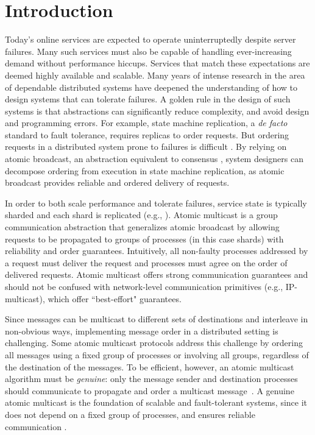 \section{Introduction}
\label{sec:introduction}

Today's online services are expected to operate uninterruptedly despite server failures.
Many such services must also be capable of handling ever-increasing demand without performance hiccups.
Services that match these expectations are deemed highly available and scalable.
Many years of intense research in the area of dependable distributed systems have deepened the understanding of how to design systems that can tolerate failures.
A golden rule in the design of such systems is that abstractions can significantly reduce complexity, and avoid design and programming errors.
For example, state machine replication, a \emph{de facto} standard to fault tolerance, requires replicas to order requests.
But ordering requests in a distributed system prone to failures is difficult \cite{FLP85}.
By relying on atomic broadcast, an abstraction equivalent to consensus \cite{HT93,CT96}, system designers can decompose ordering from execution in state machine replication, as atomic broadcast provides reliable and ordered delivery of requests.

In order to both scale performance and tolerate failures, service state is typically sharded and each shard is replicated (e.g., \cite{CDE12,Long2019,Aguilera:2007}).
Atomic multicast is a group communication abstraction that generalizes atomic broadcast by allowing requests to be propagated to groups of processes (in this case shards) with reliability and order guarantees.
Intuitively, all non-faulty processes addressed by a request must deliver the request and processes must agree on the order of delivered requests.
Atomic multicast offers strong communication guarantees and should not be confused with network-level communication primitives (e.g., IP-multicast), which offer ``best-effort" guarantees.

Since messages can be multicast to different sets of destinations and interleave in non-obvious ways, implementing message order in a distributed setting is challenging.
Some atomic multicast protocols address this challenge by ordering all messages using a fixed group of processes or involving all groups, regardless of the destination of the messages.
To be efficient, however, an atomic multicast algorithm must be \emph{genuine}: only the message sender and destination processes should communicate to propagate and order a multicast message~\cite{GS01b}.
A genuine atomic multicast is the foundation of scalable and fault-tolerant systems, since it does not depend on a fixed group of processes, and ensures reliable communication \cite{Coelho2017}.

